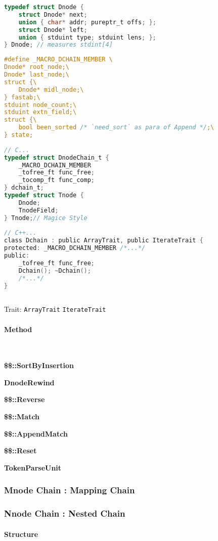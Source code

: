 \lstset{style=GlobalC}
\begin{lstlisting}[language=C]
typedef struct Dnode {
	struct Dnode* next;
	union { char* addr; pureptr_t offs; };
	struct Dnode* left;
	union { stduint type; stduint lens; };
} Dnode; // measures stdint[4]
\end{lstlisting}

\lstset{style=GlobalC}
\begin{lstlisting}[language=C]
#define _MACRO_DCHAIN_MEMBER \
Dnode* root_node;\
Dnode* last_node;\
struct {\
	Dnode* midl_node;\
} fastab;\
stduint node_count;\
stduint extn_field;\
struct {\
	bool been_sorted /* `need_sort` as para of Append */;\
} state;
	
// C...
typedef struct DnodeChain_t {
	_MACRO_DCHAIN_MEMBER
	_tofree_ft func_free;
	_tocomp_ft func_comp;
} dchain_t;
typedef struct Tnode {
	Dnode;
	TnodeField;
} Tnode;// Magice Style
	
// C++...
class Dchain : public ArrayTrait, public IterateTrait {
protected: _MACRO_DCHAIN_MEMBER /*...*/
public:
	_tofree_ft func_free;
	Dchain(); ~Dchain();
	/*...*/
}
	
\end{lstlisting}

Trait:  \verb|ArrayTrait| \verb|IterateTrait|

\paragraph{Method} \

\textbf{\$\$::SortByInsertion}

\textbf{DnodeRewind}

\textbf{\$\$::Reverse}

\textbf{\$\$::Match}

\textbf{\$\$::AppendMatch}

\textbf{\$\$::Reset}

\textbf{TokenParseUnit}

\subsubsection{Mnode Chain : Mapping Chain}

\subsubsection{Nnode Chain : Nested Chain}

\paragraph{Structure} \


